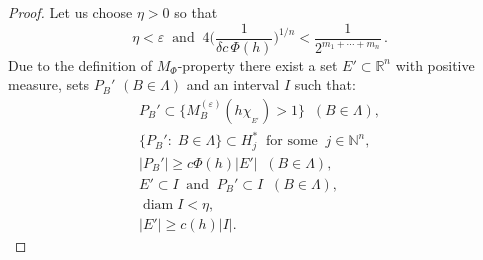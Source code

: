 \documentclass[12pt,reqno]{article}
\theoremstyle{remark}
\newcommand{\diam}{\operatorname{diam}}
\begin{document}
\begin{proof}
Let us choose $\eta>0$ so that
\begin{equation}\label{eq:1}
    \eta<\varepsilon \;\;\text{and}\;\; 4\Big(\frac{1}{\delta c\,\Phi(h)}\Big)^{1/n}<\frac{1}{2^{m_1+\cdots+m_n}}\,.
\end{equation}
Due to the definition of $M_\Phi$-property there exist a set $E'\subset \mathbb{R}^n$ with positive measure, sets $P_B'$ $(B\in\Lambda)$ and an interval $I$ such that:
\begin{gather}
    P_B'\subset \big\{M_B^{(\varepsilon)}(h\chi_{{}_{E'}})>1\big\} \;\; (B\in\Lambda), \label{eq:2} \\
    \big\{P_B':\;B\in\Lambda\big\}\subset H_j^{*} \;\;\text{for some} \;\; j\in\mathbb{N}^n, \label{eq:3} \\
    |P_B'|\geq c\Phi(h)|E'| \;\; (B\in\Lambda), \label{eq:4} \\
    E'\subset I \;\;\text{and}\;\; P_B'\subset I \;\; (B\in\Lambda), \label{eq:5} \\
    \diam I<\eta, \label{eq:6} \\
    |E'|\geq c(h)|I|. \label{eq:7}
\end{gather}


\end{proof}
\end{document}
